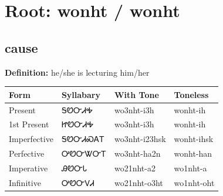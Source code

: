 \documentclass{article}%
\begin{document}
%
\normalsize%
\section*{Root: wonht / wonht}%
\subsection*{cause}%
\textbf{Definition: }%
he/she is lecturing him/her%
\\[0.5em]%
\begin{tabular}{|l|l|l|l|}%
\hline%
\textbf{Form}&\textbf{Syllabary}&\textbf{With Tone}&\textbf{Toneless}\\%
\hline%
Present&ᎦᏬᏅᏗᎭ&wo3nht{-}i3h&wonht{-}ih\\%
1st Present&ᏥᏬᏅᏗᎭ&wo3nht{-}i3h&wonht{-}ih\\%
Imperfective&ᎦᏬᏅᏗᏍᎪᎢ&wo3nht{-}i23hsk&wonht{-}ihsk\\%
Perfective&ᎤᏬᏅᏔᏅᎢ&wo3nht{-}ha2n&wonht{-}han\\%
Imperative&ᎯᏬᏅᏓ&wo21nht{-}a2&wo1nht{-}a\\%
Infinitive&ᎤᏬᏅᏙᏗ&wo21nht{-}o3ht&wo1nht{-}oht\\%
\hline%
\end{tabular}%
\\[1em]%
\end{document}
